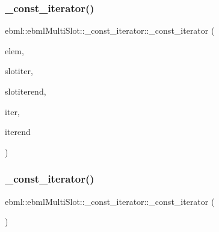 \subsubsection{\texorpdfstring{\+\_\+const\+\_\+iterator()}{\_const\_iterator()}\hspace{0.1cm}{\footnotesize\ttfamily [2/3]}}
{\footnotesize\ttfamily ebml\+::ebml\+Multi\+Slot\+::\+\_\+const\+\_\+iterator\+::\+\_\+const\+\_\+iterator (\begin{DoxyParamCaption}\item[{\mbox{\hyperlink{namespaceebml_a2deef4e8071531b32e3533f1bf978917}{c\+\_\+ebml\+Element\+\_\+sp}} \&\&}]{elem,  }\item[{std\+::vector$<$ \+\_\+slot\+\_\+t $>$\+::\mbox{\hyperlink{classebml_1_1ebmlMasterElement_1_1const__iterator}{const\+\_\+iterator}} \&\&}]{slotiter,  }\item[{std\+::vector$<$ \+\_\+slot\+\_\+t $>$\+::\mbox{\hyperlink{classebml_1_1ebmlMasterElement_1_1const__iterator}{const\+\_\+iterator}} \&\&}]{slotiterend,  }\item[{\mbox{\hyperlink{classebml_1_1const__slot__t_1_1iterator}{const\+\_\+slot\+\_\+t\+::iterator}} \&\&}]{iter,  }\item[{\mbox{\hyperlink{classebml_1_1const__slot__t_1_1iterator}{const\+\_\+slot\+\_\+t\+::iterator}} \&\&}]{iterend }\end{DoxyParamCaption})\hspace{0.3cm}{\ttfamily [protected]}}

\mbox{\label{classebml_1_1ebmlMultiSlot_1_1__const__iterator_ab8933d3fbdbf45d65ec3731f667c1a79}} 
\subsubsection{\texorpdfstring{\+\_\+const\+\_\+iterator()}{\_const\_iterator()}\hspace{0.1cm}{\footnotesize\ttfamily [3/3]}}
{\footnotesize\ttfamily ebml\+::ebml\+Multi\+Slot\+::\+\_\+const\+\_\+iterator\+::\+\_\+const\+\_\+iterator (\begin{DoxyParamCaption}{ }\end{DoxyParamCaption})}

